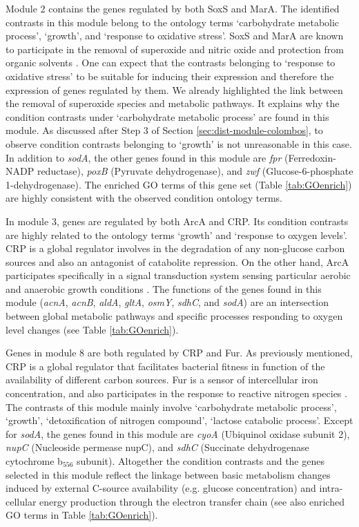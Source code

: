 Module 2 contains the genes regulated by both SoxS and MarA. The identified
contrasts in this module belong to the ontology terms `carbohydrate metabolic
process', `growth', and `response to oxidative stress'.
%
SoxS and MarA are known to participate in the removal of superoxide and nitric
oxide and protection from organic solvents \cite{Touati2000}.  One can expect
that the contrasts belonging to `response to oxidative stress' to be suitable
for inducing their expression and therefore the expression of genes regulated
by them. 
%
We already highlighted the link between the removal of superoxide species and
metabolic pathways.  It explains why the condition contrasts under
`carbohydrate metabolic process' are found in this module.  
%
As discussed after Step 3 of Section \ref{sec:dist-module-colombos}, to observe
condition contrasts belonging to `growth' is not unreasonable in this case.  
%
In addition to \textit{sodA}, the other genes found in this module are
\textit{fpr} (Ferredoxin-NADP reductase), \textit{poxB} (Pyruvate
dehydrogenase), and \textit{zwf} (Glucose-6-phosphate 1-dehydrogenase). The
enriched GO terms of this gene set (Table \ref{tab:GOenrich}) are highly
consistent with the observed condition ontology terms.


In module 3, genes are regulated by both ArcA and CRP. Its condition
contrasts are highly related to the ontology terms `growth' and
`response to oxygen levels'. 
%
CRP is a global regulator involves in the degradation of any non-glucose carbon
sources and also an antagonist of catabolite repression. 
%
On the other hand, ArcA participates specifically in a signal transduction
system sensing particular aerobic and anaerobic growth conditions
\cite{Compan1994}.  
%
The functions of the genes found in this module (\textit{acnA}, \textit{acnB},
\textit{aldA}, \textit{gltA}, \textit{osmY}, \textit{sdhC}, and \textit{sodA})
are an intersection between global metabolic pathways and specific processes
responding to oxygen level changes (see Table \ref{tab:GOenrich}).


Genes in module 8 are both regulated by CRP and Fur. As previously
mentioned, CRP is a global regulator that facilitates bacterial fitness
in function of the availability of different carbon sources. 
%
Fur is a sensor of intercellular iron concentration, and also participates in
the response to reactive nitrogen species \cite{Mukhopadhyay2004}.  
%
The contrasts of this module mainly involve `carbohydrate metabolic process',
`growth', `detoxification of nitrogen compound', `lactose catabolic
process'. 
%
Except for \textit{sodA}, the genes found in this module are \textit{cyoA}
(Ubiquinol oxidase subunit 2), \textit{nupC} (Nucleoside permease nupC), and
\textit{sdhC} (Succinate dehydrogenase cytochrome b$_{556}$ subunit).
%
Altogether the condition contrasts and the genes selected in this module
reflect the linkage between basic metabolism changes induced by external
C-source availability (e.g. glucose concentration) and intra-cellular energy
production through the electron transfer chain (see also enriched GO terms in
Table \ref{tab:GOenrich}).



